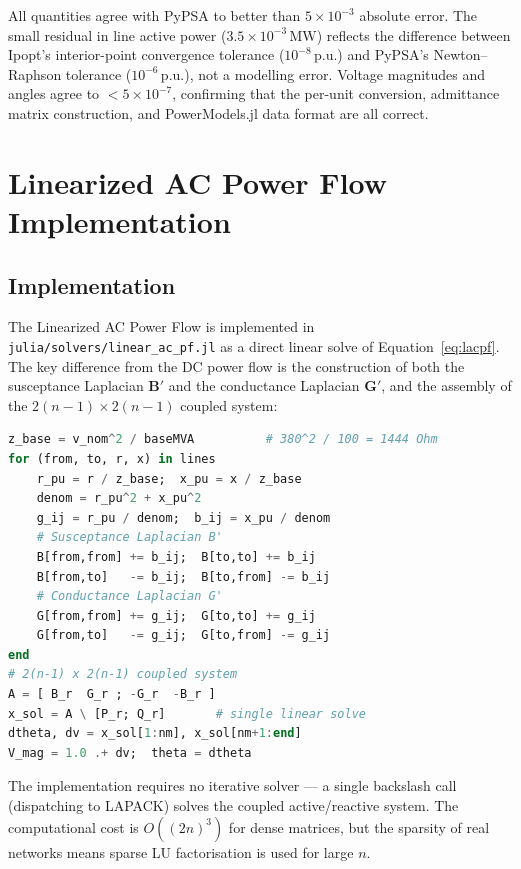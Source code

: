 All quantities agree with PyPSA to better than $5 \times 10^{-3}$ absolute error. The small residual in line active power ($3.5 \times 10^{-3}\,\text{MW}$) reflects the difference between Ipopt's interior-point convergence tolerance ($10^{-8}\,\text{p.u.}$) and PyPSA's Newton--Raphson tolerance ($10^{-6}\,\text{p.u.}$), not a modelling error. Voltage magnitudes and angles agree to $< 5 \times 10^{-7}$, confirming that the per-unit conversion, admittance matrix construction, and PowerModels.jl data format are all correct.

\section{Linearized AC Power Flow Implementation}

\subsection{Implementation}

The Linearized AC Power Flow is implemented in \texttt{julia/solvers/linear\_ac\_pf.jl} as a direct linear solve of Equation~\eqref{eq:lacpf}. The key difference from the DC power flow is the construction of both the susceptance Laplacian $\mathbf{B}'$ and the conductance Laplacian $\mathbf{G}'$, and the assembly of the $2(n-1) \times 2(n-1)$ coupled system:

\begin{lstlisting}[language=Julia, caption={Linearized AC PF: admittance matrices and coupled solve}, label={lst:lacpf_core}]
z_base = v_nom^2 / baseMVA          # 380^2 / 100 = 1444 Ohm
for (from, to, r, x) in lines
    r_pu = r / z_base;  x_pu = x / z_base
    denom = r_pu^2 + x_pu^2
    g_ij = r_pu / denom;  b_ij = x_pu / denom
    # Susceptance Laplacian B'
    B[from,from] += b_ij;  B[to,to] += b_ij
    B[from,to]   -= b_ij;  B[to,from] -= b_ij
    # Conductance Laplacian G'
    G[from,from] += g_ij;  G[to,to] += g_ij
    G[from,to]   -= g_ij;  G[to,from] -= g_ij
end
# 2(n-1) x 2(n-1) coupled system
A = [ B_r  G_r ; -G_r  -B_r ]
x_sol = A \ [P_r; Q_r]       # single linear solve
dtheta, dv = x_sol[1:nm], x_sol[nm+1:end]
V_mag = 1.0 .+ dv;  theta = dtheta
\end{lstlisting}

The implementation requires no iterative solver --- a single backslash call (dispatching to LAPACK) solves the coupled active/reactive system. The computational cost is $O((2n)^3)$ for dense matrices, but the sparsity of real networks means sparse LU factorisation is used for large $n$.

